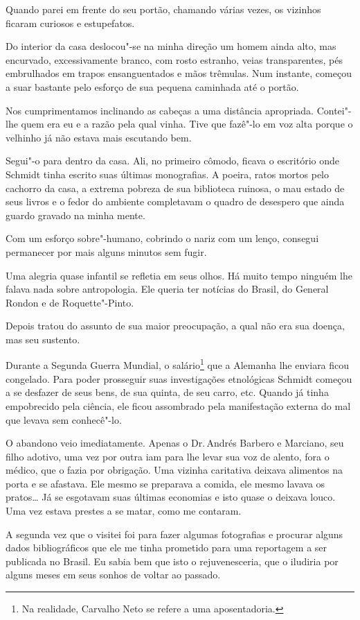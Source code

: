Quando parei em frente do seu portão, chamando várias vezes, os vizinhos
ficaram curiosos e estupefatos.

Do interior da casa deslocou"-se na minha direção um homem ainda alto,
mas encurvado, excessivamente branco, com rosto estranho, veias
transparentes, pés embrulhados em trapos ensanguentados e mãos trêmulas.
Num instante, começou a suar bastante pelo esforço de sua pequena
caminhada até o portão.

Nos cumprimentamos inclinando as cabeças a uma distância apropriada.
Contei"-lhe quem era eu e a razão pela qual vinha. Tive que fazê"-lo em
voz alta porque o velhinho já não estava mais escutando bem.

Segui"-o para dentro da casa. Ali, no primeiro cômodo, ficava o
escritório onde Schmidt tinha escrito suas últimas monografias. A
poeira, ratos mortos pelo cachorro da casa, a extrema pobreza de sua
biblioteca ruinosa, o mau estado de seus livros e o fedor do ambiente
completavam o quadro de desespero que ainda guardo gravado na minha
mente.

Com um esforço sobre"-humano, cobrindo o nariz com um lenço, consegui
permanecer por mais alguns minutos sem fugir.

Uma alegria quase infantil se refletia em seus olhos. Há muito tempo
ninguém lhe falava nada sobre antropologia. Ele queria ter notícias do
Brasil, do General Rondon e de Roquette"-Pinto.

Depois tratou do assunto de sua maior preocupação, a qual não era sua
doença, mas seu sustento.

Durante a Segunda Guerra Mundial, o salário\footnote{Na realidade,
  Carvalho Neto se refere a uma aposentadoria.} que a Alemanha %
lhe enviara ficou congelado. Para poder prosseguir suas investigações
etnológicas Schmidt começou a se desfazer de seus bens, de sua quinta,
de seu carro, etc. Quando já tinha empobrecido pela ciência, ele ficou
assombrado pela manifestação externa do mal que levava sem conhecê"-lo.

O abandono veio imediatamente. Apenas o Dr.\,Andrés Barbero e Marciano,
seu filho adotivo, uma vez por outra iam para lhe levar sua voz de
alento, fora o médico, que o fazia por obrigação. Uma vizinha caritativa
deixava alimentos na porta e se afastava. Ele mesmo se preparava a
comida, ele mesmo lavava os pratos\ldots{} Já se esgotavam suas últimas
economias e isto quase o deixava louco. Uma vez estava prestes a se
matar, como me contaram.

A segunda vez que o visitei foi para fazer algumas fotografias e
procurar alguns dados bibliográficos que ele me tinha prometido para uma
reportagem a ser publicada no Brasil. Eu sabia bem que isto o
rejuvenesceria, que o iludiria por alguns meses em seus sonhos de voltar
ao passado.


